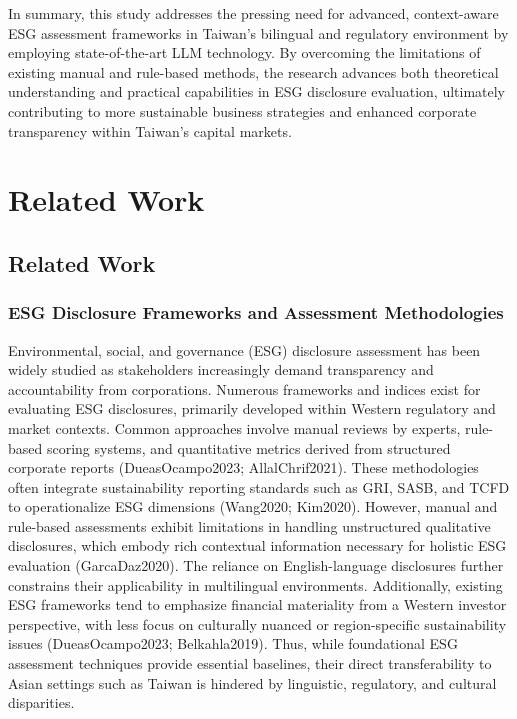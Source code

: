 \documentclass[
  12pt,
]{article}
\begin{document}
In summary, this study addresses the pressing need for advanced,
context-aware ESG assessment frameworks in Taiwan's bilingual and
regulatory environment by employing state-of-the-art LLM technology. By
overcoming the limitations of existing manual and rule-based methods,
the research advances both theoretical understanding and practical
capabilities in ESG disclosure evaluation, ultimately contributing to
more sustainable business strategies and enhanced corporate transparency
within Taiwan's capital markets.

\section{Related Work}\label{related-work}

\subsection{Related Work}\label{related-work-1}

\subsubsection{ESG Disclosure Frameworks and Assessment
Methodologies}\label{esg-disclosure-frameworks-and-assessment-methodologies}

Environmental, social, and governance (ESG) disclosure assessment has
been widely studied as stakeholders increasingly demand transparency and
accountability from corporations. Numerous frameworks and indices exist
for evaluating ESG disclosures, primarily developed within Western
regulatory and market contexts. Common approaches involve manual reviews
by experts, rule-based scoring systems, and quantitative metrics derived
from structured corporate reports (DueasOcampo2023; AllalChrif2021).
These methodologies often integrate sustainability reporting standards
such as GRI, SASB, and TCFD to operationalize ESG dimensions (Wang2020;
Kim2020). However, manual and rule-based assessments exhibit limitations
in handling unstructured qualitative disclosures, which embody rich
contextual information necessary for holistic ESG evaluation
(GarcaDaz2020). The reliance on English-language disclosures further
constrains their applicability in multilingual environments.
Additionally, existing ESG frameworks tend to emphasize financial
materiality from a Western investor perspective, with less focus on
culturally nuanced or region-specific sustainability issues
(DueasOcampo2023; Belkahla2019). Thus, while foundational ESG assessment
techniques provide essential baselines, their direct transferability to
Asian settings such as Taiwan is hindered by linguistic, regulatory, and
cultural disparities.
\end{document}
